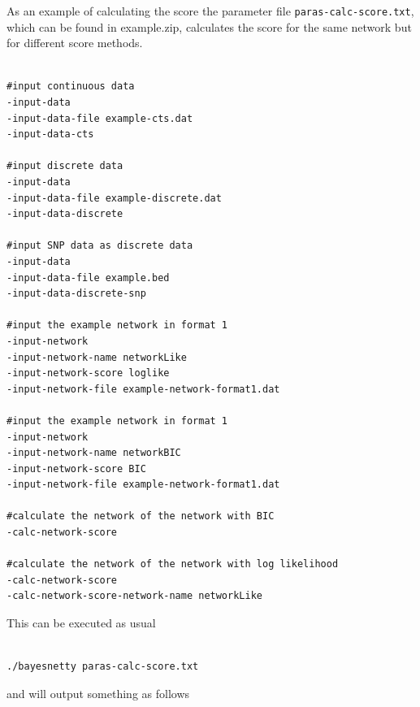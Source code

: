 \documentclass[a4paper,12pt]{article}
\newcommand{\code}[1]{{\footnotesize{{\tt #1}}}}
\begin{document}
As an example of calculating the score the parameter file \code{paras-calc-score.txt}, which can be found in example.zip, calculates the score for the same network but for different score methods. 
\vspace{0.35cm} \begin{lstlisting}

#input continuous data
-input-data
-input-data-file example-cts.dat
-input-data-cts

#input discrete data
-input-data
-input-data-file example-discrete.dat
-input-data-discrete

#input SNP data as discrete data
-input-data
-input-data-file example.bed
-input-data-discrete-snp

#input the example network in format 1
-input-network
-input-network-name networkLike
-input-network-score loglike
-input-network-file example-network-format1.dat

#input the example network in format 1
-input-network
-input-network-name networkBIC
-input-network-score BIC
-input-network-file example-network-format1.dat

#calculate the network of the network with BIC
-calc-network-score

#calculate the network of the network with log likelihood
-calc-network-score
-calc-network-score-network-name networkLike

\end{lstlisting} \vspace{0.35cm}
This can be executed as usual 
\vspace{0.35cm} \begin{lstlisting}

./bayesnetty paras-calc-score.txt

\end{lstlisting} \vspace{0.35cm}
and will output something as follows 
\end{document}
